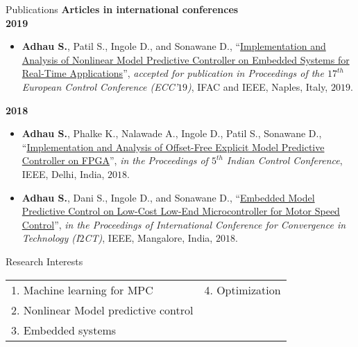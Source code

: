 \documentclass[11pt]{resume}
\newenvironment{outerlist}[1][\enskip\textbullet]%
{\begin{itemize}[#1,leftmargin=*]}{\end{itemize}%
	\vspace{-.5\baselineskip}}
\begin{document}
\begin{rSection}{Publications}
	\textbf{Articles in international conferences}\\
	\textbf{2019}
	\begin{outerlist}
	\item \textbf{Adhau S.}, Patil S., Ingole D., and Sonawane D., ``\href{https://www.researchgate.net/publication/331225239_Implementation_and_Analysis_of_Nonlinear_Model_Predictive_Controller_on_Embedded_Systems_for_Real-Time_Applications}{Implementation and Analysis of Nonlinear Model Predictive Controller on Embedded Systems for Real-Time Applications}'', \textit{accepted for publication in Proceedings of the $ 17^{th} $ European Control Conference (ECC'$19 $)}, IFAC and IEEE, Naples, Italy, $ 2019 $.
	\end{outerlist}

	\textbf{2018}
	\begin{outerlist}
	\item \textbf{Adhau S.}, Phalke K., Nalawade A., Ingole D., Patil S., Sonawane D., ``\href{https://saketadhau.netlify.com/publication/icc/icc.pdf}{Implementation and Analysis of Offset-Free Explicit Model Predictive Controller on FPGA}'', \textit{in the Proceedings of $ 5^{th} $ Indian Control Conference}, IEEE, Delhi, India, $ 2018 $.

	\item \textbf{Adhau S.}, Dani S., Ingole D., and Sonawane D., ``\href{https://saketadhau.netlify.com/publication/i2ct/i2ct.pdf}{Embedded Model Predictive Control on Low-Cost Low-End Microcontroller for Motor Speed Control}'', \textit{in the Proceedings of International Conference for Convergence in Technology (I$ 2 $CT)}, IEEE, Mangalore, India, $ 2018 $.	
	\end{outerlist}
\end{rSection}	
\vspace{5mm}
\begin{rSection}{Research Interests}
\begin{tabu} to 1\textwidth {  X[l]  X[l]  }
1. Machine learning for MPC & 4. Optimization  \\ 
2. Nonlinear Model predictive control & \\
3. Embedded systems & \\
\end{tabu}
\end{rSection}
\vspace{5mm}
\end{document}
